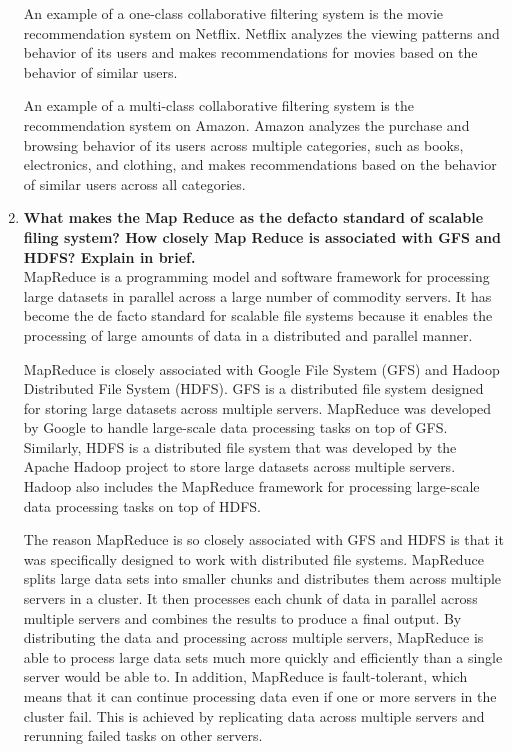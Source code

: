 \documentclass[12pt]{article}
\begin{document}
\begin{enumerate}
    An example of a one-class collaborative filtering system is the movie recommendation system on Netflix. Netflix analyzes the viewing patterns and behavior of its users and makes recommendations for movies based on the behavior of similar users.
    
    An example of a multi-class collaborative filtering system is the recommendation system on Amazon. Amazon analyzes the purchase and browsing behavior of its users across multiple categories, such as books, electronics, and clothing, and makes recommendations based on the behavior of similar users across all categories.
\item {\bfseries  What makes the Map Reduce as the defacto standard of scalable filing system? How closely Map Reduce is associated with GFS and HDFS? Explain in brief.\\}
MapReduce is a programming model and software framework for processing large datasets in parallel across a large number of commodity servers. It has become the de facto standard for scalable file systems because it enables the processing of large amounts of data in a distributed and parallel manner.

MapReduce is closely associated with Google File System (GFS) and Hadoop Distributed File System (HDFS). GFS is a distributed file system designed for storing large datasets across multiple servers. MapReduce was developed by Google to handle large-scale data processing tasks on top of GFS. Similarly, HDFS is a distributed file system that was developed by the Apache Hadoop project to store large datasets across multiple servers. Hadoop also includes the MapReduce framework for processing large-scale data processing tasks on top of HDFS.

The reason MapReduce is so closely associated with GFS and HDFS is that it was specifically designed to work with distributed file systems. MapReduce splits large data sets into smaller chunks and distributes them across multiple servers in a cluster. It then processes each chunk of data in parallel across multiple servers and combines the results to produce a final output. By distributing the data and processing across multiple servers, MapReduce is able to process large data sets much more quickly and efficiently than a single server would be able to. In addition, MapReduce is fault-tolerant, which means that it can continue processing data even if one or more servers in the cluster fail. This is achieved by replicating data across multiple servers and rerunning failed tasks on other servers.


\end{enumerate}
\end{document}
